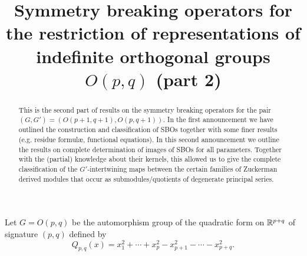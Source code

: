 \documentclass[reqno,12pt]{pja00} %
\theoremstyle{definition}
\theoremstyle{exampstyle} \newtheorem{examp}[theorem]{Theorem}
\begin{document}
\title{Symmetry breaking operators for the restriction of representations of indefinite orthogonal groups $O(p,q)$ (part 2)}

  \maketitle
\begin{abstract}
This is the second part of results on the symmetry breaking operators for the pair $(G, G') =(O(p+1, q+1), O(p,q+1))$.
In the first announcement we have outlined the construction and classification of SBOs together with some finer results
(e.g. residue formul\ae, functional equations). In this second announcement we outline the results on complete determination of
images of SBOs for all parameters. Together with the (partial) knowledge about their kernels, this allowed us to give the complete classification
of the $G'$-intertwining maps between the certain families of Zuckerman derived modules that occur as submodules/quotients of degenerate principal series.
\end{abstract}

Let $G=O(p,q)$ be the automorphism group of the quadratic form
on $\mathbb{R}^{p+q}$ of signature $(p,q)$ defined by
\begin{equation*}
	Q_{p,q}(x)
		=x_1^2+\cdots+x_{p}^2-x_{p+1}^2-\cdots-x_{p+q}^2.
\end{equation*}
\end{document}
